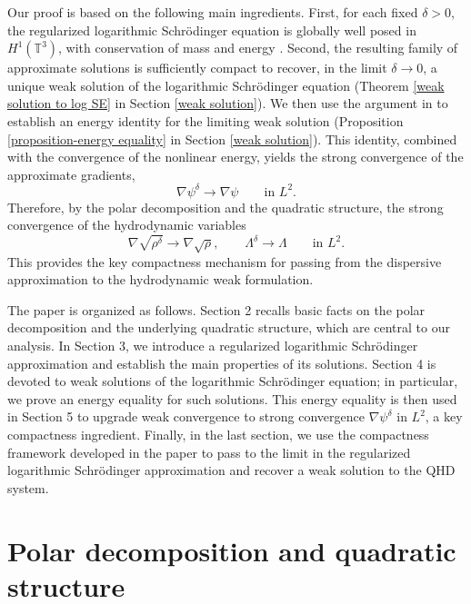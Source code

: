 \documentclass[11pt]{article}
\begin{document}
 Our  proof is based on the following main ingredients. First, for each fixed \(\delta>0\), the regularized logarithmic Schr\"odinger equation is globally well posed in \(H^1(\mathbb{T}^3)\), with conservation of mass and  energy \cite{Cazenave2003,GuerreroLopezNieto2010}. Second, the resulting family of approximate solutions is sufficiently compact to recover, in the limit $\delta \to 0$, a unique weak solution of the logarithmic Schr\"odinger equation (Theorem \ref{weak solution to log SE} in Section \ref{weak solution}). We then use the  argument in \cite{Haraux1981}
to establish an energy identity for the limiting weak solution (Proposition \ref{proposition-energy equality}
 in Section \ref{weak solution}). This identity, combined with the convergence of the  nonlinear energy, yields the strong convergence of the approximate gradients,
\[
\nabla \psi^\delta \to \nabla \psi
\qquad \text{in } L^2.
\]
Therefore, by the polar decomposition and the quadratic structure, the strong convergence of the hydrodynamic variables
\[
\nabla \sqrt{\rho^\delta} \to \nabla \sqrt{\rho},
\qquad
\Lambda^\delta \to \Lambda
\qquad \text{in } L^2.
\]
This provides the key compactness mechanism for passing from the dispersive approximation to the hydrodynamic weak formulation.



 


\medskip

 
 






The paper is organized as follows. Section 2 recalls basic facts on the polar decomposition and the underlying quadratic structure, which are central to our analysis. In Section 3, we introduce a regularized logarithmic Schrödinger approximation and establish the main properties of its solutions. Section 4 is devoted to weak solutions of the logarithmic Schrödinger equation; in particular, we prove an energy equality for such solutions. This energy equality is then used in Section 5 to upgrade weak convergence to strong convergence $\nabla\psi^{\delta}$ in $L^2$, a key compactness ingredient. Finally, in the last section, we use the compactness framework developed in the paper to pass to the limit in the regularized logarithmic Schrödinger approximation and recover a weak solution to the QHD system.
\medskip


\section{Polar decomposition and quadratic structure}\label{sec:polar}
\end{document}
